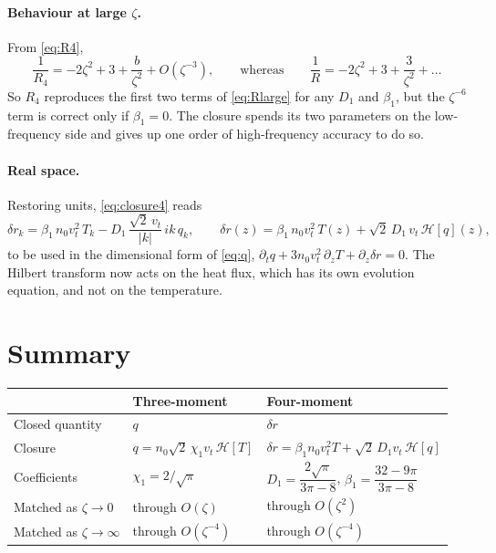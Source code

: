 \documentclass[11pt]{article}
\newcommand{\Hil}{\mathcal{H}}
\newcommand{\vt}{v_t}
\begin{document}
\paragraph{Behaviour at large $\zeta$.} From \eqref{eq:R4},
\[
  \frac{1}{R_4} = -2\zeta^2 + 3 + \frac{b}{\zeta^2} + O(\zeta^{-3}),
  \qquad\text{whereas}\qquad
  \frac{1}{R} = -2\zeta^2 + 3 + \frac{3}{\zeta^2} + \dots
\]
So $R_4$ reproduces the first two terms of \eqref{eq:Rlarge} for any $D_1$
and $\beta_1$, but the $\zeta^{-6}$ term is correct only if $\beta_1 = 0$.
The closure spends its two parameters on the low-frequency side and gives up
one order of high-frequency accuracy to do so.

\paragraph{Real space.} Restoring units, \eqref{eq:closure4} reads
\begin{equation}
  \delta r_k = \beta_1\,n_0\vt^2\,T_k
             - D_1\,\frac{\sqrt{2}\,\vt}{|k|}\,i k\,q_k ,
  \qquad
  \delta r(z) = \beta_1\,n_0\vt^2\,T(z)
              + \sqrt{2}\,D_1\,\vt\,\Hil[q](z),
\end{equation}
to be used in the dimensional form of \eqref{eq:q},
$\partial_t q + 3 n_0\vt^2\,\partial_z T + \partial_z\delta r = 0$.
The Hilbert transform now acts on the heat flux, which has its own evolution
equation, and not on the temperature.

\section{Summary}

\begin{center}
\renewcommand{\arraystretch}{1.5}
\begin{tabular}{lll}
  & Three-moment & Four-moment \\ \hline
  Closed quantity & $q$ & $\delta r$ \\
  Closure & $q = n_0\sqrt{2}\,\chi_1\vt\,\Hil[T]$
          & $\delta r = \beta_1 n_0\vt^2 T + \sqrt{2}\,D_1\vt\,\Hil[q]$ \\
  Coefficients & $\chi_1 = 2/\sqrt{\pi}$
          & $D_1 = \dfrac{2\sqrt{\pi}}{3\pi-8}$,\;
            $\beta_1 = \dfrac{32-9\pi}{3\pi-8}$ \\
  Matched as $\zeta \to 0$ & through $O(\zeta)$ & through $O(\zeta^2)$ \\
  Matched as $\zeta \to \infty$ & through $O(\zeta^{-4})$
          & through $O(\zeta^{-4})$ \\
\end{tabular}
\end{center}
\end{document}
